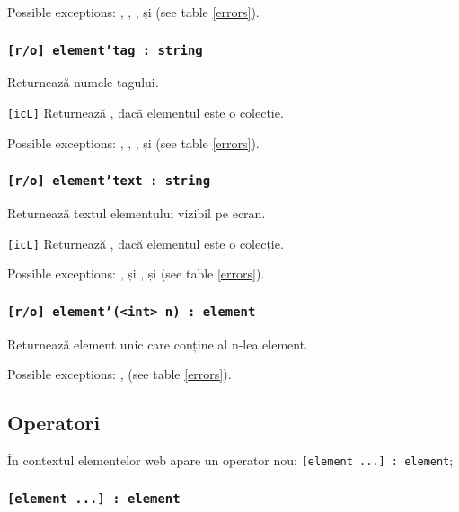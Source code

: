 Possible exceptions: , , ,  și  (see table \ref{errors}).

\subsubsection{\texttt{[r/o] element'tag : string}}

Returnează numele tagului.

\texttt{[icL]} Returnează \listtype, dacă elementul este o colecție.

Possible exceptions: , , ,  și  (see table \ref{errors}).

\subsubsection{\texttt{[r/o] element'text : string}}

Returnează textul elementului vizibil pe ecran. 

\texttt{[icL]} Returnează \listtype, dacă elementul este o colecție.

Possible exceptions: ,  și ,  și  (see table \ref{errors}).

\subsubsection{\texttt{[r/o] element'(<int> n) : element}}

Returnează element unic care conține al n-lea element.

Possible exceptions: ,  (see table \ref{errors}).

\subsection{Operatori}

În contextul elementelor web apare un operator nou: \texttt{[element ...] : element};

\subsubsection{\texttt{[element ...] : element}}

